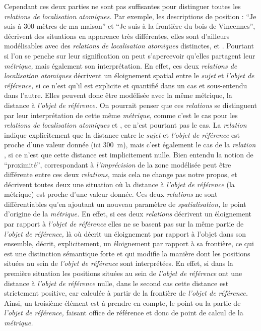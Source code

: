 Cependant ces deux parties ne sont pas suffisantes pour distinguer
toutes les \emph{relations de localisation atomiques.} Par exemple,
les descriptions de position : \enquote{Je suis à 300 mètres de ma
  maison} et \enquote{Je suis à la frontière du bois de Vincennes},
décrivent des situations en apparence très différentes, elles sont
d'ailleurs modélisables avec des \emph{relations de localisation
  atomiques} distinctes,  et
. Pourtant si l'on se penche sur leur
signification on peut s’apercevoir qu'elles partagent leur
\emph{métrique,} mais également son interprétation. En effet, ces deux
\emph{relations de localisation atomiques} décrivent un éloignement
spatial entre le \emph{sujet} et \emph{l'objet de référence,} si ce
n'est qu'il est explicite et quantifié dans un cas et sous-entendu
dans l'autre. Elles peuvent donc être modélisée avec la même métrique,
la distance à \emph{l'objet de référence.} On pourrait penser que ces
\emph{relations} se distinguent par leur interprétation de cette même
\emph{métrique,} comme c'est le cas pour les \emph{relations de
  localisation atomiques}  et
, ce n'est pourtant pas le cas. La
\emph{relation}  indique
explicitement que la distance entre le \emph{sujet} et \emph{l'objet
  de référence} est proche d'une valeur donnée (ici \SI{300}{\meter}),
mais c'est également le cas de la \emph{relation}
, si ce n'est que cette distance est
implicitement nulle. Bien entendu la notion de \enquote{proximité},
correspondant à \emph{l'imprécision} de la zone modélisée peut être
différente entre ces deux \emph{relations,} mais cela ne change pas
notre propos,  et
 décrivent toutes deux une situation
où la distance à \emph{l'objet de référence} (\ie la métrique) est
proche d'une valeur donnée. Ces deux \emph{relations} ne sont
différentiables qu'en ajoutant un nouveau paramètre de
\emph{spatialisation,} le point d'origine de la \emph{métrique.} En
effet, si ces deux \emph{relations} décrivent un éloignement par
rapport à \emph{l'objet de référence} elles ne se basent pas sur la
même partie de \emph{l'objet de référence,} là où
 décrit un éloignement par rapport à
l'objet dans son ensemble,  décrit,
explicitement, un éloignement par rapport à sa frontière, ce qui est
une distinction sémantique forte et qui modifie la manière dont les
positions situées au sein de \emph{l'objet de référence} sont
interprétées. En effet, si dans la première situation les positions
situées au sein de \emph{l'objet de référence} ont une distance à
\emph{l'objet de référence} nulle, dans le second cas cette distance
est strictement positive, car calculée à partir de la frontière de
\emph{l'objet de référence.} Ainsi, un troisième élément est à prendre
en compte, le point ou la partie de \emph{l'objet de référence,}
faisant office de référence et donc de point de calcul de la
\emph{métrique.}

